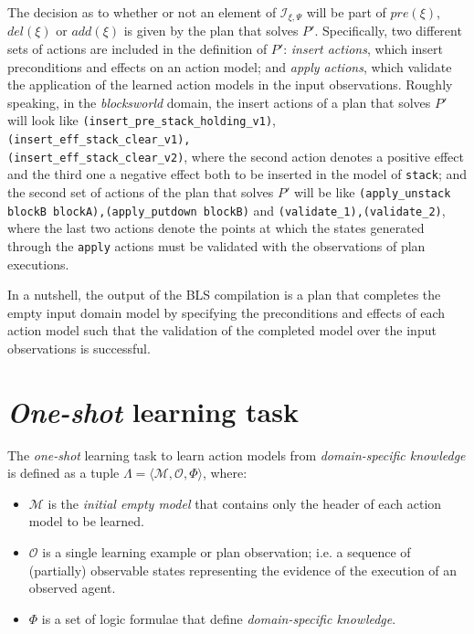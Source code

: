 \documentclass{article}
\newcommand{\tup}[1]{{\langle #1 \rangle}}
\begin{document}
The decision as to whether or not an element of ${\mathcal I}_{\xi,\Psi}$ will be part of $pre(\xi)$, $del(\xi)$ or $add(\xi)$ is given by the plan that solves $P'$. Specifically, two different sets of actions are included in the definition of $P'$: \emph{insert actions}, which insert preconditions and effects on an action model; and \emph{apply actions}, which validate the application of the learned action models in the input observations. Roughly speaking, in the \emph{blocksworld} domain, the insert actions of a plan that solves $P'$ will look like {\tt{\footnotesize(insert\_pre\_stack\_holding\_v1)}},\\
{\tt{\footnotesize(insert\_eff\_stack\_clear\_v1),\\
(insert\_eff\_stack\_clear\_v2)}}, where the second action denotes a positive effect and the third one a negative effect both to be inserted in the model of {\tt{\small stack}}; and the second set of actions of the plan that solves $P'$ will be like {\tt{\small (apply\_unstack blockB blockA),(apply\_putdown blockB)}} and {\tt{\small (validate\_1),(validate\_2)}}, where the last two actions denote the points at which the states generated through the {\tt {\small apply}} actions must be validated with the observations of plan executions.

In a nutshell, the output of the BLS compilation is a plan that completes the empty input domain model by specifying the preconditions and effects of each action model such that the validation of the completed model over the input observations is successful.





\section{{\em One-shot} learning task}
\label{sec:learning}

The {\em one-shot} learning task to learn action models from {\em domain-specific knowledge} is defined as a tuple $\Lambda=\tup{\mathcal{M},{\mathcal O},\Phi}$, where:

\begin{itemize}
\item $\mathcal{M}$ is the {\em initial empty model} that contains only the header of each action model to be learned.
\item $\mathcal{O}$ is a single learning example or plan observation; i.e. a sequence of (partially) observable states representing the evidence of the execution of an observed agent.
\item $\Phi$ is a set of logic formulae that define {\em domain-specific knowledge}.
\end{itemize}
\end{document}
